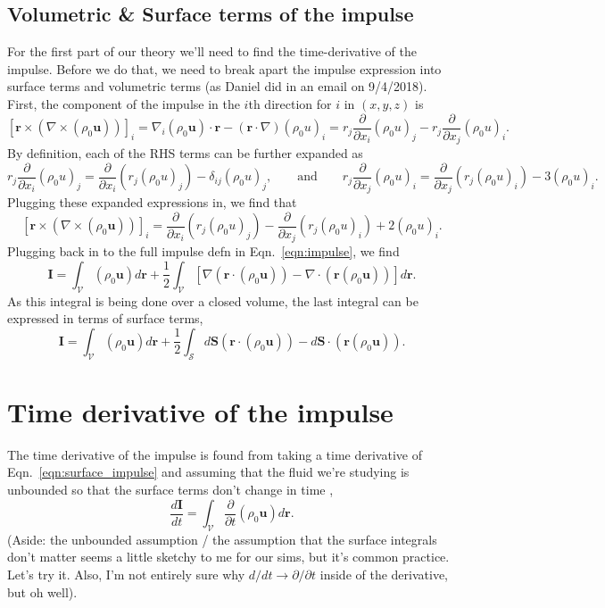 \documentclass[onecolumn, amsmath, amsfonts, amssymb]{aastex62}
\newcommand{\grad}{\ensuremath{\nabla}}
\begin{document}
\subsection{Volumetric \& Surface terms of the impulse}
For the first part of our theory we'll need to find the time-derivative of the impulse. Before we do that, 
we need to break apart the impulse expression into surface terms and volumetric terms (as Daniel did in an email
on 9/4/2018). First, the component of the impulse in the $i$th direction for $i$ in $(x,y,z)$ is
$$
[\bm{r}\times(\grad\times(\rho_0\bm{u}))]_i = 
\grad_i(\rho_0\bm{u}) \cdot \bm{r}- (\bm{r}\cdot\grad)(\rho_0 u)_i = 
r_j\frac{\partial}{\partial x_i}(\rho_0 u)_j - r_j \frac{\partial}{\partial x_j}(\rho_0 u)_i.
$$
By definition, each of the RHS terms can be further expanded as
$$
r_j\frac{\partial}{\partial x_i}(\rho_0 u)_j =
\frac{\partial}{\partial x_i}(r_j(\rho_0 u)_j) - \delta_{ij}(\rho_0 u)_j,\qquad\text{and}
\qquad
r_j \frac{\partial}{\partial x_j}(\rho_0 u)_i =
\frac{\partial}{\partial x_j}(r_j(\rho_0 u)_i) - 3(\rho_0 u)_i.
$$
Plugging these expanded expressions in, we find that
$$
[\bm{r}\times(\grad\times(\rho_0\bm{u}))]_i = 
\frac{\partial}{\partial x_i}(r_j(\rho_0 u)_j) -
\frac{\partial}{\partial x_j}(r_j(\rho_0 u)_i) +
2(\rho_0 u)_i.
$$
Plugging back in to the full impulse defn in Eqn.~\ref{eqn:impulse}, we find
\begin{equation}
\bm{I} = \int_{\mathcal{V}} (\rho_0 \bm{u}) d\bm{r} + 
\frac{1}{2}\int_{\mathcal{V}} [\grad (\bm{r}\cdot(\rho_0 \bm{u})) - \grad \cdot(\bm{r}(\rho_0\bm{u}))] d\bm{r}.
\end{equation}
As this integral is being done over a closed volume, the last integral can be expressed in terms of surface terms,
\begin{equation}
\bm{I} = \int_{\mathcal{V}} (\rho_0 \bm{u}) d\bm{r} + 
\frac{1}{2}\int_{\mathcal{S}} d\bm{S}(\bm{r}\cdot(\rho_0 \bm{u})) - d\bm{S} \cdot(\bm{r}(\rho_0\bm{u})).
\label{eqn:surface_impulse}
\end{equation}

\section{Time derivative of the impulse}
The time derivative of the impulse is found from taking a time derivative of 
Eqn.~\ref{eqn:surface_impulse} and assuming that the fluid we're studying is unbounded
so that the surface terms don't change in time \citep[as in][]{shivamoggi2010},
\begin{equation}
\frac{d \bm{I}}{d t} = \int_{\mathcal{V}}\frac{\partial}{\partial t}(\rho_0 \bm{u}) d\bm{r}.
\end{equation}
(Aside: the unbounded assumption / the assumption that the surface integrals don't matter
seems a little sketchy to me for our sims, but it's common practice. Let's try it.
Also, I'm not entirely sure why $d/dt \rightarrow \partial/\partial t$
inside of the derivative, but oh well). 
\end{document}
